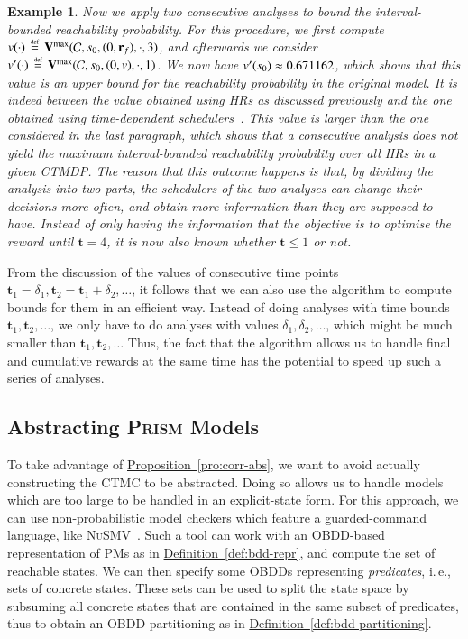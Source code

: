 \documentclass[10pt,twocolumn]{article}
\newtheorem{example}{Example}
\newcommand{\PRISM}{\textsc{Prism}\xspace}
\newcommand{\NUSMV}{\textsc{NuSMV}\xspace}
\newcommand{\state}  {{\ensuremath s}}
\newcommand{\cmodel}{\mathcal{C}}
\newcommand{\frew}{\mathbf{r}_f}
\newcommand{\timeb}{\mathbf{t}}
\newcommand{\mvalue}{\mathbf{V}}
\newcommand{\refdef}[1]{\texorpdfstring{\hyperref[def:#1]{Definition~\ref*{def:#1}}}{Definition \ref*{def:#1}}}
\newcommand{\refpro}[1]{\texorpdfstring{\hyperref[pro:#1]{Proposition~\ref*{pro:#1}}}{Proposition~\ref*{pro:#1}}}
\newcommand{\defeq}{\,\stackrel{\mbox{\rm {\tiny def}}}{=}\,}
\begin{document}
\begin{example}
Now we apply two consecutive analyses to bound the interval-bounded reachability probability.
For this procedure, we first compute $v(\cdot) \defeq \mvalue^{\max}(\cmodel, \state_0, (0,\frew), \cdot, 3)$,
and afterwards we consider $v'(\cdot) \defeq \mvalue^{\max}(\cmodel, \state_0, (0,v), \cdot, 1)$.
We now have $v'(\state_0) \approx 0.671162$, which shows that this value is an upper bound for the reachability probability in the original model.
It is indeed between the value obtained using HRs as discussed previously and the one obtained using time-dependent schedulers~\cite{ZhangN10,BuchholzHHZ11}. 
This value is larger than the one considered in the last paragraph, which shows that a consecutive analysis does not yield the maximum interval-bounded reachability probability over all HRs in a given CTMDP.
The reason that this outcome happens is that, by dividing the analysis into two parts, the schedulers of the two analyses can change their decisions more often,
and obtain more information than they are supposed to have.
Instead of only having the information that the objective is to
optimise the reward until $\timeb = 4$, it is now also known whether
$\timeb \leq 1$ or not.
\end{example}

From the discussion of the values of consecutive time points 
$\timeb_1 = \delta_1, \timeb_2 = \timeb_1 + \delta_2, \ldots$, 
it follows that we can also use the algorithm to compute bounds for
them in an efficient way. Instead of doing analyses with time bounds
$\timeb_1, \timeb_2, \ldots$, we only have to do analyses with
values $\delta_1, \delta_2, \ldots$, which might be much smaller than
$\timeb_1, \timeb_2, \ldots$ Thus, the fact that the algorithm
allows us to handle final and cumulative rewards at the same time has the
potential to speed up such a series of analyses.

\subsection{Abstracting \PRISM Models}

\noindent To take advantage of \refpro{corr-abs}, we want to avoid actually
constructing the CTMC to be abstracted. Doing so allows us to handle
models which are too large to be handled in an explicit-state form.
For this approach, we can use non-probabilistic model checkers which feature a
guarded-command language, like \NUSMV~\cite{CimattiCGGPRST02}. Such a
tool can work with an OBDD-based representation of PMs as in
\refdef{bdd-repr}, and compute the set of reachable states. We can
then specify some OBDDs representing \emph{predicates}, i.\,e., sets
of concrete states. These sets can be used to split the state space
by subsuming all concrete states that are contained in the same
subset of predicates, thus to obtain an OBDD partitioning as in
\refdef{bdd-partitioning}.
\end{document}
